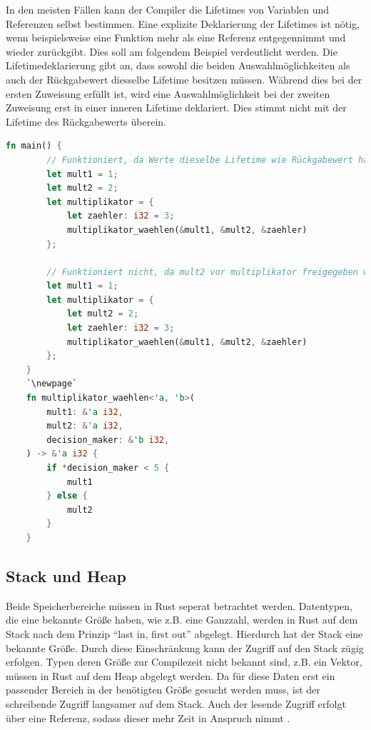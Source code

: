 \documentclass[11pt,a4paper, ngerman]{article}
\begin{document}
In den meisten Fällen kann der Compiler die Lifetimes von Variablen und Referenzen selbst bestimmen. Eine explizite Deklarierung der Lifetimes ist nötig, wenn beispielsweise eine Funktion mehr als eine Referenz entgegennimmt und wieder zurückgibt. Dies soll am folgendem Beispiel verdeutlicht werden. Die Lifetimedeklarierung  gibt an, dass sowohl die beiden Auswahlmöglichkeiten als auch der Rückgabewert diesselbe Lifetime besitzen müssen. Während dies bei der ersten Zuweisung erfüllt ist, wird eine Auswahlmöglichkeit bei der zweiten Zuweisung erst in einer inneren Lifetime deklariert. Dies stimmt nicht mit der Lifetime des Rückgabewerts überein.

\begin{lstlisting}[language=rust, caption={Lifetime Beispiele \cite{RustLifetimeEx}}]
    fn main() {
        // Funktioniert, da Werte dieselbe Lifetime wie Rückgabewert haben
        let mult1 = 1;
        let mult2 = 2;
        let multiplikator = {
            let zaehler: i32 = 3;
            multiplikator_waehlen(&mult1, &mult2, &zaehler)
        };

        // Funktioniert nicht, da mult2 vor multiplikator freigegeben wird
        let mult1 = 1;
        let multiplikator = {
            let mult2 = 2;
            let zaehler: i32 = 3;
            multiplikator_waehlen(&mult1, &mult2, &zaehler)
        };
    }
    `\newpage`
    fn multiplikator_waehlen<'a, 'b>(
        mult1: &'a i32,
        mult2: &'a i32,
        decision_maker: &'b i32,
    ) -> &'a i32 {
        if *decision_maker < 5 {
            mult1
        } else {
            mult2
        }
    }
\end{lstlisting}

\subsection{Stack und Heap}
Beide Speicherbereiche müssen in Rust seperat betrachtet werden. Datentypen, die eine bekannte Größe haben, wie z.B. eine Ganzzahl, werden in Rust auf dem Stack nach dem Prinzip ``last in, first out'' abgelegt. Hierdurch hat der Stack eine bekannte Größe. Durch diese Einschränkung kann der Zugriff auf den Stack zügig erfolgen. Typen deren Größe zur Compilezeit nicht bekannt sind, z.B. ein Vektor, müssen in Rust auf dem Heap abgelegt werden. Da für diese Daten erst ein passender Bereich in der benötigten Größe gesucht werden muss, ist der schreibende Zugriff langsamer auf dem Stack. Auch der lesende Zugriff erfolgt über eine Referenz, sodass dieser mehr Zeit in Anspruch nimmt \cite{StackHeap} \cite[S. 233 ff.]{SK19}. 
\end{document}
